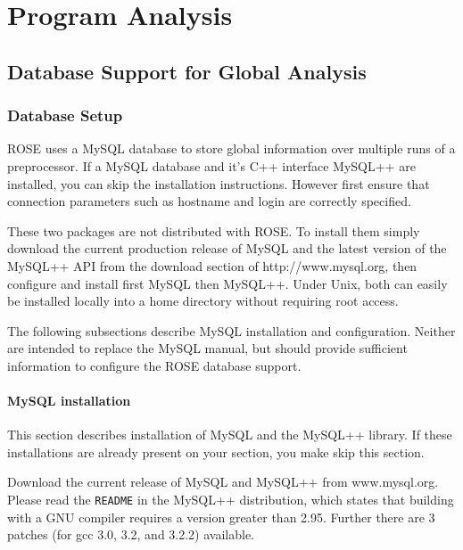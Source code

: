 \documentclass[times, 10pt]{book}
\begin{document}
 
\date{}
 
\chapter{Program Analysis}

\section{Database Support for Global Analysis}
\label{RoseExamples:RoseTutorial:Database}
 
 
\subsection{Database Setup}
\label{sec:DatabaseRequirements}

ROSE uses a MySQL database to store global information over
multiple runs of a preprocessor.  If a MySQL database and it's C++ 
interface MySQL++ are installed,
you can skip the installation instructions. 
However first ensure that connection parameters such as hostname and 
login are correctly specified.

These two packages are not distributed with ROSE.  To install them
simply download the current production release of MySQL and
the latest version of the MySQL++ API from the download section
of http://www.mysql.org, then configure and install first MySQL then
MySQL++. Under Unix, both can easily be installed locally into a home directory
without requiring root access. 

The following subsections describe MySQL installation and configuration.
Neither are intended to replace the MySQL manual, but should provide
sufficient information to configure the ROSE database support.

\subsubsection{MySQL installation}

This section describes installation of MySQL and the MySQL++ library.
If these installations are already present on your section, you
make skip this section.

Download the current release of MySQL and MySQL++ from www.mysql.org.  
Please read the {\tt README} in the MySQL++ distribution, which states
that building with a GNU compiler requires a version greater than 2.95.
Further there are 3 patches (for gcc 3.0, 3.2, and 3.2.2) available.
\end{document}
